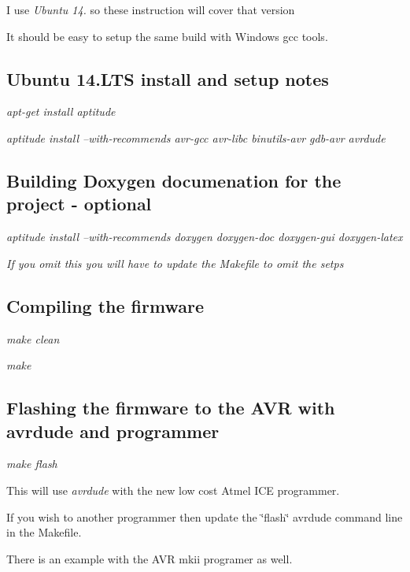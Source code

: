 \begin{DoxyItemize}
\item I use {\itshape Ubuntu 14.} so these instruction will cover that version
\begin{DoxyItemize}
\item It should be easy to setup the same build with Windows gcc tools. \subsection*{Ubuntu 14.\-L\-T\-S install and setup notes}
\end{DoxyItemize}
\item {\itshape apt-\/get install aptitude}
\item {\itshape aptitude install --with-\/recommends avr-\/gcc avr-\/libc binutils-\/avr gdb-\/avr avrdude} \subsection*{Building Doxygen documenation for the project -\/ optional}
\end{DoxyItemize}


\begin{DoxyItemize}
\item {\itshape aptitude install --with-\/recommends doxygen doxygen-\/doc doxygen-\/gui doxygen-\/latex}
\item {\itshape If you omit this you will have to update the Makefile to omit the setps}
\end{DoxyItemize}

\subsection*{Compiling the firmware}


\begin{DoxyItemize}
\item {\itshape make clean}
\item {\itshape make}
\end{DoxyItemize}

\subsection*{Flashing the firmware to the A\-V\-R with avrdude and programmer}


\begin{DoxyItemize}
\item {\itshape make flash}
\begin{DoxyItemize}
\item This will use {\itshape avrdude} with the new low cost Atmel I\-C\-E programmer.
\begin{DoxyItemize}
\item If you wish to another programmer then update the \char`\"{}flash\char`\"{} avrdude command line in the Makefile.
\item There is an example with the A\-V\-R mkii programer as well.
\end{DoxyItemize}
\end{DoxyItemize}
\end{DoxyItemize}



 